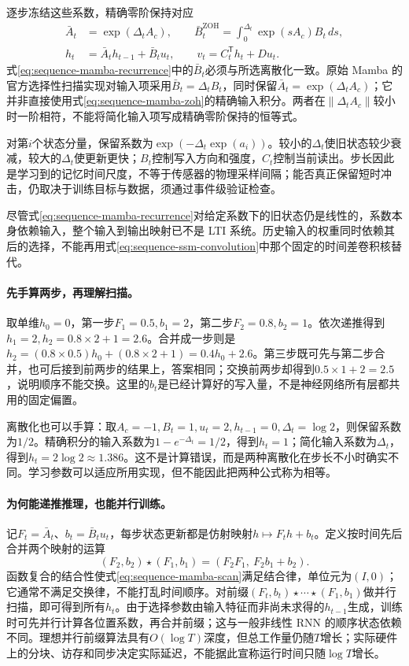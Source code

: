 逐步冻结这些系数，精确零阶保持对应
\begin{align}
 \bar A_t&=\exp(\Delta_t A_c),\qquad
 \bar B_t^{\mathrm{ZOH}}=\int_0^{\Delta_t}\exp(sA_c)B_t\,ds,
 \label{eq:sequence-mamba-zoh}\\
 h_t&=\bar A_t h_{t-1}+\bar B_t u_t,\qquad
 v_t=C_t^{\mathsf T}h_t+Du_t.
 \label{eq:sequence-mamba-recurrence}
\end{align}
式\eqref{eq:sequence-mamba-recurrence}中的$\bar B_t$必须与所选离散化一致。原始 Mamba 的官方选择性扫描实现对输入项采用$\bar B_t=\Delta_t B_t$，同时保留$\bar A_t=\exp(\Delta_t A_c)$；它并非直接使用式\eqref{eq:sequence-mamba-zoh}的精确输入积分。两者在$\|\Delta_t A_c\|$较小时一阶相符，不能将简化输入项写成精确零阶保持的恒等式。

对第$i$个状态分量，保留系数为$\exp(-\Delta_t\exp(a_i))$。较小的$\Delta_t$使旧状态较少衰减，较大的$\Delta_t$使更新更快；$B_t$控制写入方向和强度，$C_t$控制当前读出。步长因此是学习到的记忆时间尺度，不等于传感器的物理采样间隔；能否真正保留短时冲击，仍取决于训练目标与数据，须通过事件级验证检查。

尽管式\eqref{eq:sequence-mamba-recurrence}对给定系数下的旧状态仍是线性的，系数本身依赖输入，整个输入到输出映射已不是 LTI 系统。历史输入的权重同时依赖其后的选择，不能再用式\eqref{eq:sequence-ssm-convolution}中那个固定的时间差卷积核替代。

\paragraph{先手算两步，再理解扫描。}
取单维$h_0=0$，第一步$F_1=0.5,b_1=2$，第二步$F_2=0.8,b_2=1$。依次递推得到$h_1=2,h_2=0.8\times2+1=2.6$。合并成一步则是$h_2=(0.8\times0.5)h_0+(0.8\times2+1)=0.4h_0+2.6$。第三步既可先与第二步合并，也可后接到前两步的结果上，答案相同；交换前两步却得到$0.5\times1+2=2.5$，说明顺序不能交换。这里的$b_t$是已经计算好的写入量，不是神经网络所有层都共用的固定偏置。

离散化也可以手算：取$A_c=-1,B_t=1,u_t=2,h_{t-1}=0,\Delta_t=\log2$，则保留系数为$1/2$。精确积分的输入系数为$1-e^{-\Delta_t}=1/2$，得到$h_t=1$；简化输入系数为$\Delta_t$，得到$h_t=2\log2\approx1.386$。这不是计算错误，而是两种离散化在步长不小时确实不同。学习参数可以适应所用实现，但不能因此把两种公式称为相等。

\paragraph{为何能递推推理，也能并行训练。}
记$F_t=\bar A_t$、$b_t=\bar B_t u_t$，每步状态更新都是仿射映射$h\mapsto F_t h+b_t$。定义按时间先后合并两个映射的运算
\begin{equation}
 (F_2,b_2)\star(F_1,b_1)
   =(F_2F_1,\ F_2b_1+b_2).
 \label{eq:sequence-mamba-scan}
\end{equation}
函数复合的结合性使式\eqref{eq:sequence-mamba-scan}满足结合律，单位元为$(I,0)$；它通常不满足交换律，不能打乱时间顺序。对前缀$(F_t,b_t)\star\cdots\star(F_1,b_1)$做并行扫描，即可得到所有$h_t$。由于选择参数由输入特征而非尚未求得的$h_{t-1}$生成，训练时可先并行计算各位置系数，再合并前缀；这与一般非线性 RNN 的顺序状态依赖不同。理想并行前缀算法具有$O(\log T)$深度，但总工作量仍随$T$增长；实际硬件上的分块、访存和同步决定实际延迟，不能据此宣称运行时间只随$\log T$增长。

